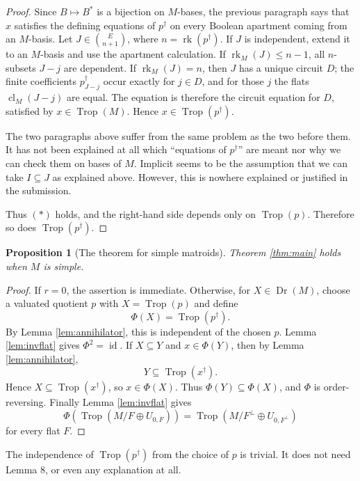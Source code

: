 \documentclass[12pt]{article}
\newtheorem{proposition}[theorem]{Proposition}
\theoremstyle{definition}
\newcommand{\Trop}{\operatorname{Trop}}
\newcommand{\Dr}{\operatorname{Dr}}
\newcommand{\rk}{\operatorname{rk}}
\newcommand{\cl}{\operatorname{cl}}
\newcommand{\binomE}[1]{\binom{E}{#1}}
\newcommand{\review}[1]{\begin{reviewbox}#1\end{reviewbox}}
\begin{document}
\begin{proof}
Since \(B\mapsto B^*\) is a bijection on \(M\)-bases, the previous paragraph says that \(x\) satisfies the defining equations of \(p^\dagger\) on every Boolean apartment coming from an \(M\)-basis.  Let \(J\in\binomE{n+1}\), where \(n=\rk(p^\dagger)\).  If \(J\) is independent, extend it to an \(M\)-basis and use the apartment calculation.  If \(\rk_M(J)\le n-1\), all \(n\)-subsets \(J-j\) are dependent.  If \(\rk_M(J)=n\), then \(J\) has a unique circuit \(D\); the finite coefficients \(p^\dagger_{J-j}\) occur exactly for \(j\in D\), and for those \(j\) the flats \(\cl_M(J-j)\) are equal.  The equation is therefore the circuit equation for \(D\), satisfied by \(x\in\Trop(M)\).  Hence \(x\in\Trop(p^\dagger)\).
\review{The two paragraphs above suffer from the same problem as the two before them. It has not been explained at all which ``equations of $p^{\dagger}$'' are meant nor why we can check them on bases of $M$. Implicit seems to be the assumption that we can take $I \subseteq J$ as explained above. However, this is nowhere explained or justified in the submission.}

Thus \((*)\) holds, and the right-hand side depends only on \(\Trop(p)\).  Therefore so does \(\Trop(p^\dagger)\).
\end{proof}

\begin{proposition}[The theorem for simple matroids]\label{prop:simple}
Theorem \ref{thm:main} holds when \(M\) is simple.
\end{proposition}

\begin{proof}
If \(r=0\), the assertion is immediate.  Otherwise, for \(X\in\Dr(M)\), choose a valuated quotient \(p\) with \(X=\Trop(p)\) and define
\[
\Phi(X)=\Trop(p^\dagger).
\]
By Lemma \ref{lem:annihilator}, this is independent of the chosen \(p\).  Lemma \ref{lem:invflat} gives \(\Phi^2=\operatorname{id}\).  If \(X\subseteq Y\) and \(x\in\Phi(Y)\), then by Lemma \ref{lem:annihilator},
\[
Y\subseteq\Trop(x^\dagger).
\]
Hence \(X\subseteq\Trop(x^\dagger)\), so \(x\in\Phi(X)\).  Thus \(\Phi(Y)\subseteq\Phi(X)\), and \(\Phi\) is order-reversing.  Finally Lemma \ref{lem:invflat} gives
\[
\Phi\!\left(\Trop(M/F\oplus U_{0,F})\right)
=
\Trop(M/F^\perp\oplus U_{0,F^\perp})
\]
for every flat \(F\).
\end{proof}
\review{The independence of $\Trop(p^{\dagger})$ from the choice of $p$ is trivial. It does not need Lemma 8, or even any explanation at all.}
\end{document}
